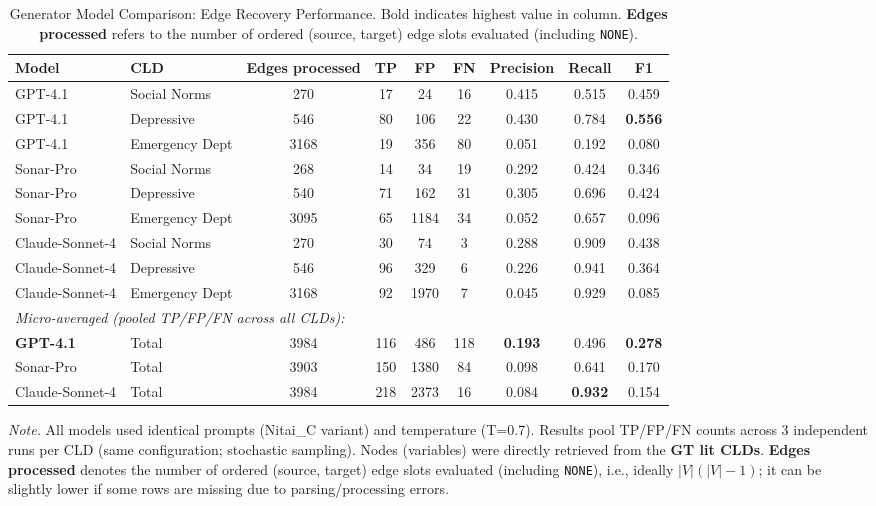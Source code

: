 \begin{table}[H]
\centering
\caption{Generator Model Comparison: Edge Recovery Performance. Bold indicates highest value in column. \textbf{Edges processed} refers to the number of ordered (source, target) edge slots evaluated (including \texttt{NONE}).}
\label{tab:generator_model_comparison}
\begin{threeparttable}
\begin{tabular}{llccccccc}
\toprule
\textbf{Model} & \textbf{CLD} & \textbf{Edges processed} & \textbf{TP} & \textbf{FP} & \textbf{FN} & \textbf{Precision} & \textbf{Recall} & \textbf{F1} \\
\midrule
GPT-4.1 & Social Norms & 270 & 17 & 24 & 16 & 0.415 & 0.515 & 0.459 \\
GPT-4.1 & Depressive & 546 & 80 & 106 & 22 & 0.430 & 0.784 & \textbf{0.556} \\
GPT-4.1 & Emergency Dept & 3168 & 19 & 356 & 80 & 0.051 & 0.192 & 0.080 \\
\midrule
Sonar-Pro & Social Norms & 268 & 14 & 34 & 19 & 0.292 & 0.424 & 0.346 \\
Sonar-Pro & Depressive & 540 & 71 & 162 & 31 & 0.305 & 0.696 & 0.424 \\
Sonar-Pro & Emergency Dept & 3095 & 65 & 1184 & 34 & 0.052 & 0.657 & 0.096 \\
\midrule
Claude-Sonnet-4 & Social Norms & 270 & 30 & 74 & 3 & 0.288 & 0.909 & 0.438 \\
Claude-Sonnet-4 & Depressive & 546 & 96 & 329 & 6 & 0.226 & 0.941 & 0.364 \\
Claude-Sonnet-4 & Emergency Dept & 3168 & 92 & 1970 & 7 & 0.045 & 0.929 & 0.085 \\
\midrule
\multicolumn{9}{l}{\textit{Micro-averaged (pooled TP/FP/FN across all CLDs):}} \\
\textbf{GPT-4.1} & Total & 3984 & 116 & 486 & 118 & \textbf{0.193} & 0.496 & \textbf{0.278} \\
Sonar-Pro & Total & 3903 & 150 & 1380 & 84 & 0.098 & 0.641 & 0.170 \\
Claude-Sonnet-4 & Total & 3984 & 218 & 2373 & 16 & 0.084 & \textbf{0.932} & 0.154 \\
\bottomrule
\end{tabular}
\begin{tablenotes}
\small
\item \textit{Note.} All models used identical prompts (Nitai\_C variant) and temperature (T=0.7). Results pool TP/FP/FN counts across 3 independent runs per CLD (same configuration; stochastic sampling). Nodes (variables) were directly retrieved from the \textbf{GT lit CLDs}. \textbf{Edges processed} denotes the number of ordered (source, target) edge slots evaluated (including \texttt{NONE}), i.e., ideally $|V|(|V|-1)$; it can be slightly lower if some rows are missing due to parsing/processing errors.
\end{tablenotes}
\end{threeparttable}
\end{table}